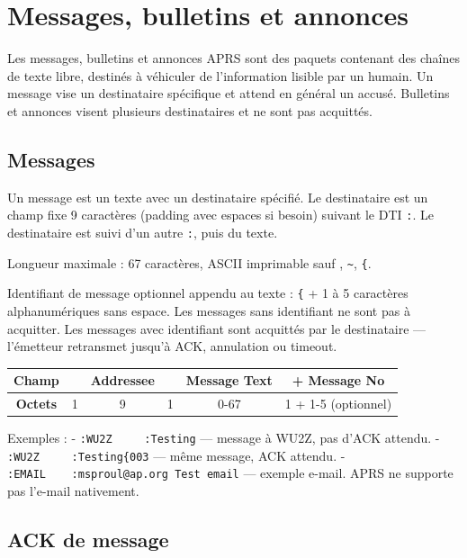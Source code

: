 \chapter[MESSAGES, BULLETINS ET ANNONCES]{Messages, bulletins et
annonces}\label{messages-bulletins-et-annonces}

Les messages, bulletins et annonces APRS sont des paquets contenant des
chaînes de texte libre, destinés à véhiculer de l'information lisible
par un humain. Un message vise un destinataire spécifique et attend en
général un accusé. Bulletins et annonces visent plusieurs destinataires
et ne sont pas acquittés.

\section{Messages}\label{messages}

Un message est un texte avec un destinataire spécifié. Le destinataire
est un champ fixe 9 caractères (padding avec espaces si besoin) suivant
le DTI \texttt{:}. Le destinataire est suivi d'un autre \texttt{:}, puis
du texte.

Longueur maximale : 67 caractères, ASCII imprimable sauf
\texttt{\textbar{}}, \texttt{\textasciitilde{}}, \texttt{\{}.

Identifiant de message optionnel appendu au texte : \texttt{\{} + 1 à 5
caractères alphanumériques sans espace. Les messages sans identifiant ne
sont pas à acquitter. Les messages avec identifiant sont acquittés par
le destinataire --- l'émetteur retransmet jusqu'à ACK, annulation ou
timeout.

\begin{center}
\begin{tabular}{|c|c|c|c|c|c|}
\hline
\textbf{Champ} & \lit{:} & Addressee & \lit{:} & Message Text & \lit{\{} + Message No \\
\hline
\textbf{Octets} & 1 & 9 & 1 & 0-67 & 1 + 1-5 (optionnel) \\
\hline
\end{tabular}
\end{center}

Exemples : - \texttt{:WU2Z\ \ \ \ \ :Testing} --- message à WU2Z, pas
d'ACK attendu. - \texttt{:WU2Z\ \ \ \ \ :Testing\{003} --- même message,
ACK attendu. - \texttt{:EMAIL\ \ \ \ :msproul@ap.org\ Test\ email} ---
exemple e-mail. APRS ne supporte pas l'e-mail nativement.

\section{ACK de message}\label{ack-de-message}

